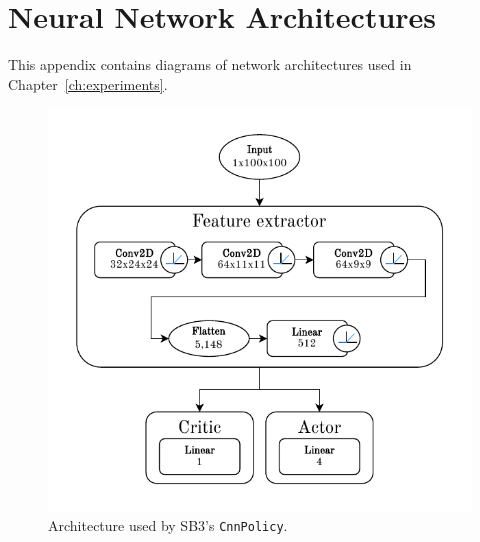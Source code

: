 \documentclass[
  digital,     %
  oneside,     %
  nosansbold,  %
  nocolorbold, %
  lof,         %
  lot,         %
]{fithesis4}
\begin{document}
\printbibliography[heading=bibintoc] %


\appendix %
\chapter{Neural Network Architectures}
This appendix contains diagrams of network architectures used in Chapter~\ref{ch:experiments}.

\begin{figure}
    \includegraphics[width=1\linewidth]{diagrams/cnn_arch.pdf}
    \caption{Architecture used by SB3's \texttt{CnnPolicy}.}
    \label{fig:cnn_policy}
\end{figure}
\end{document}
